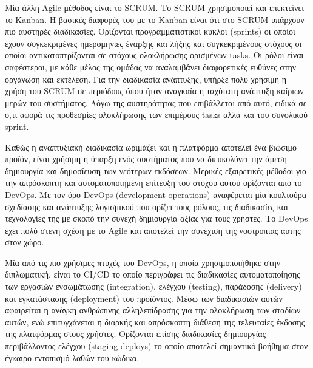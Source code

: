Μία άλλη Agile μέθοδος είναι το SCRUM. Το SCRUM χρησιμοποιεί και επεκτείνει το Kanban. Η βασικές διαφορές του με το Kanban είναι ότι στο SCRUM υπάρχουν πιο αυστηρές διαδικασίες. Ορίζονται προγραμματιστικοί κύκλοι (sprints) οι οποίοι έχουν συγκεκριμένες ημερομηνίες έναρξης και λήξης και συγκεκριμένους στόχους οι οποίοι αντικατοπτρίζονται σε στόχους ολοκλήρωσης ορισμένων tasks. Οι ρόλοι είναι σαφέστεροι, με κάθε μέλος της ομάδας να αναλαμβάνει διαφορετικές ευθύνες στην οργάνωση και εκτέλεση. Για την διαδικασία ανάπτυξης, υπήρξε πολύ χρήσιμη η χρήση του SCRUM σε περιόδους όπου ήταν αναγκαία η ταχύτατη ανάπτυξη καίριων μερών του συστήματος. Λόγω της αυστηρότητας που επιβάλλεται από αυτό, ειδικά σε ό,τι αφορά τις προθεσμίες ολοκλήρωσης των επιμέρους tasks αλλά και του συνολικού sprint.

Καθώς η αναπτυξιακή διαδικασία ωριμάζει και η πλατφόρμα αποτελεί ένα βιώσιμο προϊόν, είναι χρήσιμη η ύπαρξη ενός συστήματος που να διευκολύνει την άμεση δημιουργία και δημοσίευση των νεότερων εκδόσεων. Μερικές εξαιρετικές μέθοδοι για την απρόσκοπτη και αυτοματοποιημένη επίτευξη του στόχου αυτού ορίζονται από το DevOps. Με τον όρο DevOps (development operations) αναφέρεται μία κουλτούρα σχεδίασης και ανάπτυξης λογισμικού που ορίζει τους ρόλους, τις διαδικασίες και τεχνολογίες της με σκοπό την συνεχή δημιουργία αξίας για τους χρήστες. Το DevOps έχει πολύ στενή σχέση με το Agile και αποτελεί την συνέχιση της νοοτροπίας αυτής στον χώρο.

Μία από τις πιο χρήσιμες πτυχές του DevOps, η οποία χρησιμοποιήθηκε στην διπλωματική, είναι το CI/CD το οποίο περιγράφει τις διαδικασίες αυτοματοποίησης των εργασιών ενσωμάτωσης (integration), ελέγχου (testing), παράδοσης (delivery) και εγκατάστασης (deployment) του προϊόντος. Μέσω των διαδικασιών αυτών αφαιρείται η ανάγκη ανθρώπινης αλληλεπίδρασης για την ολοκλήρωση των σταδίων αυτών, ενώ επιτυγχάνεται η διαρκής και απρόσκοπτη διάθεση της τελευταίες έκδοσης της πλατφόρμας στους χρήστες. Ορίζονται επίσης διαδικασίες δημιουργίας περιβάλλοντος ελέγχου (staging deploys) το οποίο αποτελεί σημαντικό βοήθημα στον έγκαιρο εντοπισμό λαθών του κώδικα.
